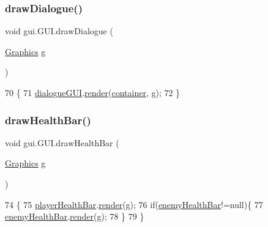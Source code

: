\subsubsection{\texorpdfstring{draw\+Dialogue()}{drawDialogue()}}
{\footnotesize\ttfamily void gui.\+G\+U\+I.\+draw\+Dialogue (\begin{DoxyParamCaption}\item[{\mbox{\hyperlink{classorg_1_1newdawn_1_1slick_1_1_graphics}{Graphics}}}]{g }\end{DoxyParamCaption})\hspace{0.3cm}{\ttfamily [inline]}}


\begin{DoxyCode}
70                                          \{
71         \mbox{\hyperlink{classgui_1_1_g_u_i_ae48d5f580a490dd73bc59e64937cc46f}{dialogueGUI}}.\mbox{\hyperlink{classgui_1_1_dialogue_g_u_i_a2163a61f391f8c158ae232af0ec7467d}{render}}(\mbox{\hyperlink{classgui_1_1_g_u_i_acaa3c69a02ef67d6ebd11fcbcc87049d}{container}}, g);
72     \}
\end{DoxyCode}
\mbox{\label{classgui_1_1_g_u_i_a56b6b966d94e7defa0fa964818091c08}} 
\subsubsection{\texorpdfstring{draw\+Health\+Bar()}{drawHealthBar()}}
{\footnotesize\ttfamily void gui.\+G\+U\+I.\+draw\+Health\+Bar (\begin{DoxyParamCaption}\item[{\mbox{\hyperlink{classorg_1_1newdawn_1_1slick_1_1_graphics}{Graphics}}}]{g }\end{DoxyParamCaption})\hspace{0.3cm}{\ttfamily [inline]}}


\begin{DoxyCode}
74                                           \{
75         \mbox{\hyperlink{classgui_1_1_g_u_i_aeda1474169fcb850223c8c6da6b49c89}{playerHealthBar}}.\mbox{\hyperlink{classgui_1_1_health_bar_a9c40e5b00050d6264dae96d7054fab06}{render}}(g);
76         \textcolor{keywordflow}{if}(\mbox{\hyperlink{classgui_1_1_g_u_i_a541d8aa4232f2616f9e085cf0879fc31}{enemyHealthBar}}!=null)\{
77             \mbox{\hyperlink{classgui_1_1_g_u_i_a541d8aa4232f2616f9e085cf0879fc31}{enemyHealthBar}}.\mbox{\hyperlink{classgui_1_1_health_bar_a9c40e5b00050d6264dae96d7054fab06}{render}}(g);
78         \}
79     \}
\end{DoxyCode}
\mbox{\label{classgui_1_1_g_u_i_a1366abd6d61b9d271363d6c209db2486}} 
